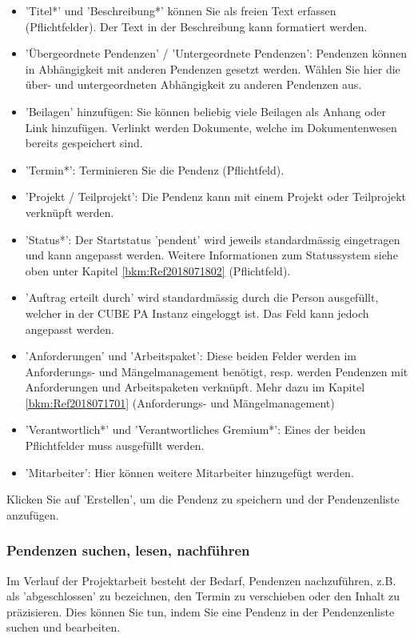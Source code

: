 \begin{itemize}
\item
'Titel*' und 'Beschreibung*' können Sie als freien Text erfassen (Pflichtfelder). Der Text in der Beschreibung kann formatiert werden.
\item
'Übergeordnete Pendenzen' / 'Untergeordnete Pendenzen': Pendenzen können in Abhängigkeit mit anderen Pendenzen gesetzt werden. Wählen Sie hier die über- und untergeordneten Abhängigkeit zu anderen Pendenzen aus.
\item 
'Beilagen' hinzufügen: Sie können beliebig viele Beilagen als Anhang oder Link hinzufügen. Verlinkt werden Dokumente, welche im Dokumentenwesen bereits gespeichert sind.
\item
'Termin*': Terminieren Sie die Pendenz (Pflichtfeld).
\item
'Projekt / Teilprojekt': Die Pendenz kann mit einem Projekt oder Teilprojekt verknüpft werden.
\item
'Status*': Der Startstatus 'pendent' wird jeweils standardmässig eingetragen und kann angepasst werden. Weitere Informationen zum Statussystem siehe oben unter Kapitel \ref{bkm:Ref2018071802} (Pflichtfeld).
\item
'Auftrag erteilt durch' wird standardmässig durch die Person ausgefüllt, welcher in der CUBE PA Instanz eingeloggt ist. Das Feld kann jedoch angepasst werden.
\item
'Anforderungen' und 'Arbeitspaket': Diese beiden Felder werden im Anforderungs- und Mängelmanagement benötigt, resp. werden Pendenzen mit Anforderungen und Arbeitspaketen verknüpft. Mehr dazu im Kapitel \ref{bkm:Ref2018071701} (Anforderungs- und Mängelmanagement)
\item
'Verantwortlich*' und 'Verantwortliches Gremium*': Eines der beiden Pflichtfelder muss ausgefüllt werden.
\item
'Mitarbeiter': Hier können weitere Mitarbeiter hinzugefügt werden.
\end{itemize}

Klicken Sie auf 'Erstellen', um die Pendenz zu speichern und der Pendenzenliste anzufügen.

\subsubsection{Pendenzen suchen, lesen, nachführen}

Im Verlauf der Projektarbeit besteht der Bedarf, Pendenzen nachzuführen, z.B. als 'abgeschlossen' zu bezeichnen, den Termin zu verschieben oder den Inhalt zu präzisieren. Dies können Sie tun, indem Sie eine Pendenz in der Pendenzenliste suchen und bearbeiten.

